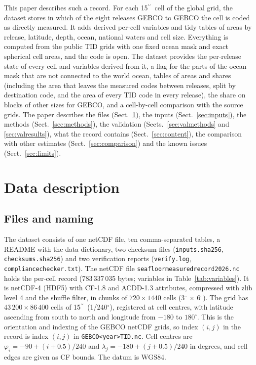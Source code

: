 \documentclass[essd, manuscript]{copernicus}
\newcommand{\as}{$^{\prime\prime}$}      %
\renewcommand{\_}{\usorig\allowbreak}
\begin{document}
This paper describes such a record.
For each 15\as\ cell of the global grid, the dataset stores in which of the eight releases GEBCO\_2019 to GEBCO\_2026 the cell is coded as directly measured.
It adds derived per-cell variables and tidy tables of areas by release, latitude, depth, ocean, national waters and cell size.
Everything is computed from the public TID grids with one fixed ocean mask and exact spherical cell areas, and the code is open.
The dataset provides the per-release state of every cell and variables derived from it, a flag for the parts of the ocean mask that are not connected to the world ocean, tables of areas and shares (including the area that leaves the measured codes between releases, split by destination code, and the area of every TID code in every release), the share on blocks of other sizes for GEBCO\_2026, and a cell-by-cell comparison with the source grids.
The paper describes the files (Sect.~\ref{sec:files}), the inputs (Sect.~\ref{sec:inputs}), the methods (Sect.~\ref{sec:methods}), the validation (Sects.~\ref{sec:valmethods} and \ref{sec:valresults}), what the record contains (Sect.~\ref{sec:content}), the comparison with other estimates (Sect.~\ref{sec:comparison}) and the known issues (Sect.~\ref{sec:limits}).

\section{Data description}
\label{sec:files}

\subsection{Files and naming}

The dataset \citep{ismoilov2026data} consists of one netCDF file, ten comma-separated tables, a README with the data dictionary, two checksum files (\texttt{inputs.sha256}, \texttt{checksums.sha256}) and two verification reports (\texttt{verify.log}, \texttt{compliance\_checker.txt}).
The netCDF file \texttt{seafloor\_measured\_record\_2019\_2026.nc} holds the per-cell record (783\,337\,035 bytes; variables in Table~\ref{tab:variables}).
It is netCDF-4 (HDF5) with CF-1.8 and ACDD-1.3 attributes, compressed with zlib level 4 and the shuffle filter, in chunks of $720 \times 1440$ cells (3$^\circ$ $\times$ 6$^\circ$).
The grid has $43\,200 \times 86\,400$ cells of 15\as\ (1/240$^\circ$), registered at cell centres, with latitude ascending from south to north and longitude from $-180$ to $180^\circ$.
This is the orientation and indexing of the GEBCO netCDF grids, so index $(i, j)$ in the record is index $(i, j)$ in \texttt{GEBCO\_<year>\_TID.nc}.
Cell centres are $\varphi_i = -90 + (i + 0.5)/240$ and $\lambda_j = -180 + (j + 0.5)/240$ in degrees, and cell edges are given as CF bounds.
The datum is WGS84.
\end{document}
